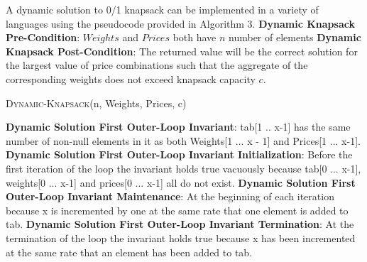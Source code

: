 \documentclass[onecolumn, 12pt, article]{IEEEtran}
\numberwithin{case}{problem}
\numberwithin{condition}{problem}
\numberwithin{condition}{subsection}
\numberwithin{definition}{section}
\theoremstyle{remark}
\numberwithin{question}{problem}
\theoremstyle{plain}
\numberwithin{answer}{problem}
\numberwithin{solution}{section}
\numberwithin{equation}{section}%
\begin{document}
A dynamic solution to 0/1 knapsack can be implemented in a variety of languages using the pseudocode provided in Algorithm 3.
\newline
\textbf{Dynamic Knapsack Pre-Condition}: $Weights$ and $Prices$ both have $n$ number of elements
\newline
\textbf{Dynamic Knapsack Post-Condition}: The returned value will be the correct solution for the largest value of price combinations such that the aggregate of the corresponding weights does not exceed knapsack capacity $c$.
\begin{algorithm}
\caption {\textsc{Dynamic-Knapsack}(n, Weights, Prices, c)}
\label{algo:dynamic}
\begin{algorithmic}[1]
\EndIf
{}
\EndIf
{}
	\EndFor
\EndFor
{}
		\EndIf
		\EndIf
	\EndFor
\EndFor
{}
\EndProcedure
\end{algorithmic}
\end{algorithm}
\newline
\textbf{Dynamic Solution First Outer-Loop Invariant}: tab[1 .. x-1] has the same number of non-null elements in it as both Weights[1 ... x - 1] and Prices[1 ... x-1].
\newline
\textbf{Dynamic Solution First Outer-Loop Invariant Initialization}: Before the first iteration of the loop the invariant holds true vacuously because tab[0 ... x-1], weights[0 ... x-1] and prices[0 ... x-1] all do not exist.
\newline
\textbf{Dynamic Solution First Outer-Loop Invariant Maintenance}: At the beginning of each iteration because x is incremented by one at the same rate that one element is added to tab.
\newline
\textbf{Dynamic Solution First Outer-Loop Invariant Termination}: At the termination of the loop the invariant holds true because x has been incremented at the same rate that an element has been added to tab.
\newline
\newline
\end{document}

